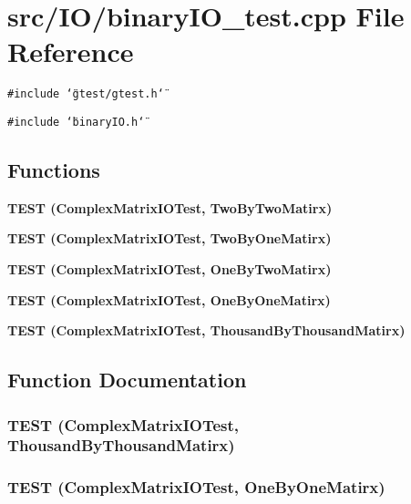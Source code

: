 \section{src/IO/binary\-IO\_\-test.cpp File Reference}
\label{binaryIO__test_8cpp}
{\tt \#include \char`\"{}gtest/gtest.h\char`\"{}}\par
{\tt \#include \char`\"{}binary\-IO.h\char`\"{}}\par
\subsection*{Functions}
\begin{CompactItemize}
\item 
\bf{TEST} (Complex\-Matrix\-IOTest, Two\-By\-Two\-Matirx)
\item 
\bf{TEST} (Complex\-Matrix\-IOTest, Two\-By\-One\-Matirx)
\item 
\bf{TEST} (Complex\-Matrix\-IOTest, One\-By\-Two\-Matirx)
\item 
\bf{TEST} (Complex\-Matrix\-IOTest, One\-By\-One\-Matirx)
\item 
\bf{TEST} (Complex\-Matrix\-IOTest, Thousand\-By\-Thousand\-Matirx)
\end{CompactItemize}


\subsection{Function Documentation}
\subsubsection{\setlength{\rightskip}{0pt plus 5cm}TEST (Complex\-Matrix\-IOTest, Thousand\-By\-Thousand\-Matirx)}\label{binaryIO__test_8cpp_d832feca548c68803f6cdc499a4fd413}


\subsubsection{\setlength{\rightskip}{0pt plus 5cm}TEST (Complex\-Matrix\-IOTest, One\-By\-One\-Matirx)}\label{binaryIO__test_8cpp_2bf0b35fe6e05c95faa08abe452115c6}


